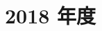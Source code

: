 \documentclass[../../hsm_tok_a.tex]{subfiles}
\begin{document}
    \section{2018 年度}

    

    \clearpage

    
\end{document}
